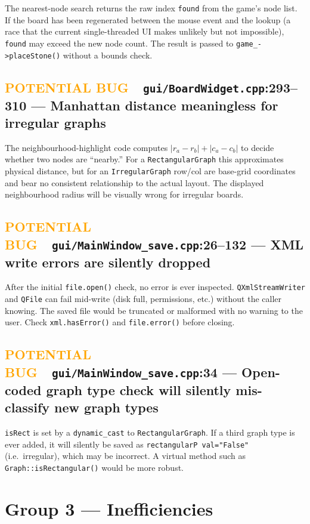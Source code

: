 \documentclass[11pt,letterpaper]{article}
\newcommand{\file}[1]{\texttt{#1}}
\newcommand{\code}[1]{\texttt{#1}}
\newcommand{\pbug}{\textcolor{orange}{\textbf{POTENTIAL BUG}}}
\begin{document}
The nearest-node search returns the raw index \code{found} from the game's
node list.  If the board has been regenerated between the mouse event and the
lookup (a race that the current single-threaded UI makes unlikely but not
impossible), \code{found} may exceed the new node count.  The result is
passed to \code{game\_->placeStone()} without a bounds check.

\subsection{\pbug\ \ \file{gui/BoardWidget.cpp}:293--310 — Manhattan distance meaningless for irregular graphs}

The neighbourhood-highlight code computes
$|r_a - r_b| + |c_a - c_b|$ to decide whether two nodes are ``nearby.''
For a \code{RectangularGraph} this approximates physical distance, but for an
\code{IrregularGraph} row/col are base-grid coordinates and bear no
consistent relationship to the actual layout.  The displayed neighbourhood
radius will be visually wrong for irregular boards.

\subsection{\pbug\ \ \file{gui/MainWindow\_save.cpp}:26--132 — XML write errors are silently dropped}

After the initial \code{file.open()} check, no error is ever inspected.
\code{QXmlStreamWriter} and \code{QFile} can fail mid-write (disk full,
permissions, etc.) without the caller knowing.  The saved file would be
truncated or malformed with no warning to the user.  Check
\code{xml.hasError()} and \code{file.error()} before closing.

\subsection{\pbug\ \ \file{gui/MainWindow\_save.cpp}:34 — Open-coded graph type check will silently mis-classify new graph types}

\code{isRect} is set by a \code{dynamic\_cast} to \code{RectangularGraph}.
If a third graph type is ever added, it will silently be saved as
\code{rectangularP val="False"} (i.e.\ irregular), which may be incorrect.
A virtual method such as \code{Graph::isRectangular()} would be more robust.

\section{Group 3 — Inefficiencies}
\end{document}
